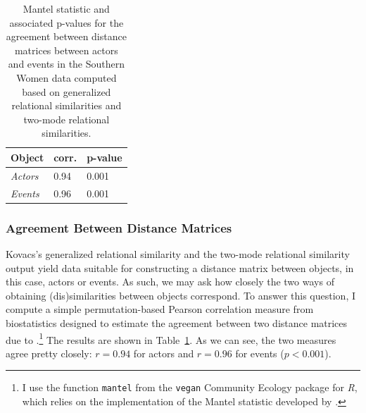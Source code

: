\documentclass[a4paper,fleqn]{cas-sc}
\begin{document}
\begin{table}[ht!]
    \caption{Mantel statistic and associated p-values for the agreement between distance matrices between actors and events in the Southern Women data computed based on generalized relational similarities and two-mode relational similarities.}
    \centering
    \begin{tabular}{lll}
        \hline
        \textbf{Object}                       & \textbf{corr.}            & \textbf{p-value}           \\ \hline
        \multicolumn{1}{|l|}{\textit{Actors}} & \multicolumn{1}{l|}{0.94} & \multicolumn{1}{l|}{0.001} \\ \hline
        \multicolumn{1}{|l|}{\textit{Events}} & \multicolumn{1}{l|}{0.96} & \multicolumn{1}{l|}{0.001} \\ \hline
    \end{tabular}
    \label{tab:mantel-sw}
\end{table}
  
\subsubsection{Agreement Between Distance Matrices}
Kovacs's generalized relational similarity and the two-mode relational similarity output yield data suitable for constructing a distance matrix between objects, in this case, actors or events. As such, we may ask how closely the two ways of obtaining (dis)similarities between objects correspond. To answer this question, I compute a simple permutation-based Pearson correlation measure from biostatistics designed to estimate the agreement between two distance matrices due to \citet{mantel1967detection}.\footnote{I use the function \texttt{mantel} from the \texttt{vegan} Community Ecology package \citep{vegan} for \textit{R}, which relies on the implementation of the Mantel statistic developed by \citet{legendre2012numerical}.} The results are shown in Table~\ref{tab:mantel-sw}. As we can see, the two measures agree pretty closely: $r = 0.94$ for actors and $r = 0.96$ for events ($p < 0.001$). 
\end{document}
